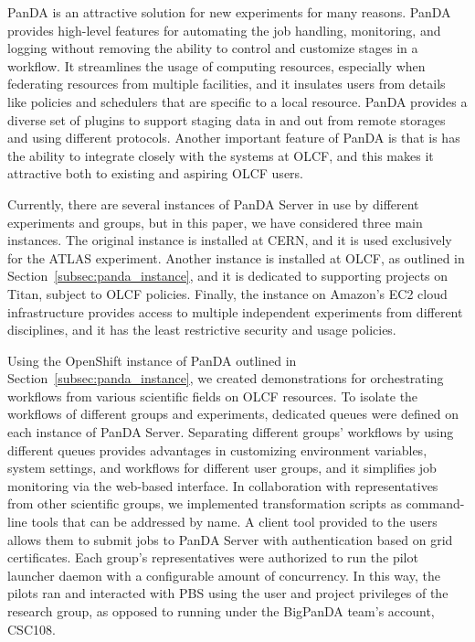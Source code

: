 PanDA is an attractive solution for new experiments for many reasons. PanDA
provides high-level features for automating the job handling, monitoring, and
logging without removing the ability to control and customize stages in a
workflow. It streamlines the usage of computing resources, especially when
federating resources from multiple facilities, and it insulates users from
details like policies and schedulers that are specific to a local resource.
PanDA provides a diverse set of plugins to support staging data in and out from
remote storages and using different protocols. Another important feature of
PanDA is that is has the ability to integrate closely with the systems at OLCF,
and this makes it attractive both to existing and aspiring OLCF users.


Currently, there are several instances of PanDA Server in use by different
experiments and groups, but in this paper, we have considered three main
instances. The original instance is installed at CERN, and it is used
exclusively for the ATLAS experiment. Another instance is installed at OLCF, as
outlined in Section~\ref{subsec:panda_instance}, and it is dedicated to
supporting projects on Titan, subject to OLCF policies. Finally, the instance
on Amazon's EC2 cloud infrastructure provides access to multiple independent
experiments from different disciplines, and it has the least restrictive
security and usage policies.

Using the OpenShift instance of PanDA outlined in
Section~\ref{subsec:panda_instance}, we created demonstrations for
orchestrating workflows from various scientific fields on OLCF resources. To
isolate the workflows of different groups and experiments, dedicated queues
were defined on each instance of PanDA Server. Separating different groups'
workflows by using different queues provides advantages in customizing
environment variables, system settings, and workflows for different user
groups, and it simplifies job monitoring via the web-based interface. In
collaboration with representatives from other scientific groups, we implemented
transformation scripts as command-line tools that can be addressed by name. A
client tool provided to the users allows them to submit jobs to PanDA Server
with authentication based on grid certificates. Each group's representatives
were authorized to run the pilot launcher daemon with a configurable amount of
concurrency. In this way, the pilots ran and interacted with PBS using the user
and project privileges of the research group, as opposed to running under the
BigPanDA team's account, CSC108.


